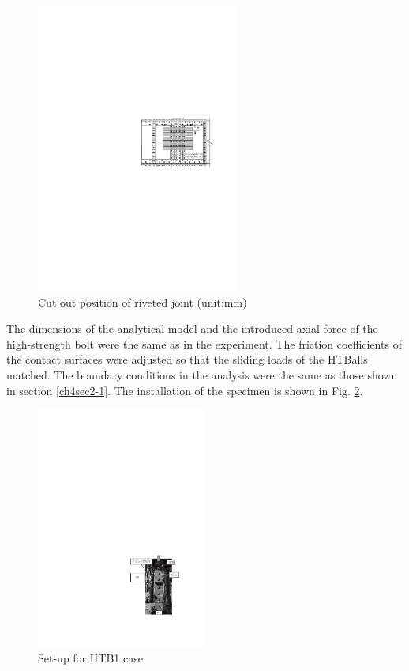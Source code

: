 \begin{figure}
    \centering
    \includegraphics[width=0.6\textwidth]{imgs/ch4/figA1.pdf}
    \caption{Cut out position of riveted joint (unit:mm) }
    \label{ch4figA1}
\end{figure}
 
The dimensions of the analytical model and the introduced axial force of the high-strength bolt were the same as in the experiment. The friction coefficients of the contact surfaces were adjusted so that the sliding loads of the HTBalls matched. The boundary conditions in the analysis were the same as those shown in section \ref{ch4sec2-1}. The installation of the specimen is shown in Fig. \ref{ch4figA2}.

\begin{figure}
    \centering
    \includegraphics[width=0.5\textwidth]{imgs/ch4/figA2.pdf}
    \caption{Set-up for HTB1 case}
    \label{ch4figA2}
\end{figure}

